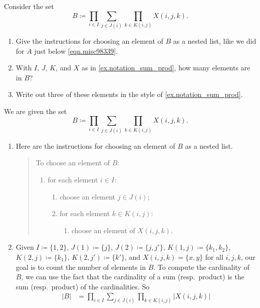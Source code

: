 \documentclass[Book-Poly]{subfiles}
\begin{document}
\begin{exercise}
Consider the set
\[B \coloneqq \prod_{i\in I}\sum_{j\in J(i)}\prod_{k\in K(i,j)}X(i,j,k).\]
\begin{enumerate}
	\item Give the instructions for choosing an element of $B$ as a nested list, like we did for $A$ just below \eqref{eqn.misc98339}.
	\item With $I$, $J$, $K$, and $X$ as in \cref{ex.notation_sum_prod}, how many elements are in $B$?
	\item Write out three of these elements in the style of \cref{ex.notation_sum_prod}.
\qedhere
\end{enumerate}
\begin{solution}
We are given the set
\[
    B \coloneqq \prod_{i\in I}\sum_{j\in J(i)}\prod_{k\in K(i,j)}X(i,j,k).
\]
\begin{enumerate}
	\item Here are the instructions for choosing an element of $B$ as a nested list.
	\begin{quote}
	    To choose an element of $B$:
	    \begin{enumerate}[label=\arabic*.]
	        \item for each element $i \in I$:
	        \begin{enumerate}[label=\arabic*.]
	            \item choose an element $j \in J(i)$;
	            \item for each element $k \in K(i, j)$:
	            \begin{enumerate}[label=\arabic*.]
	                \item choose an element of $X(i,j,k)$.
	            \end{enumerate}
	        \end{enumerate}
	    \end{enumerate}
	\end{quote}
	\item Given $I\coloneqq\{1,2\}$, $J(1)\coloneqq\{j\}$, $J(2)\coloneqq\{j,j'\}$, $K(1,j)\coloneqq\{k_1,k_2\}$, $K(2,j)\coloneqq\{k_1\}$, $K(2,j')\coloneqq\{k'\}$, and $X(i,j,k)=\{x,y\}$ for all $i,j,k$, our goal is to count the number of elements in $B$.
	To compute the cardinality of $B$, we can use the fact that the cardinality of a sum (resp.\ product) is the sum (resp.\ product) of the cardinalities.
	So
	\begin{align*}
	    |B| &= \prod_{i\in I}\sum_{j\in J(i)}\prod_{k\in K(i,j)}|X(i,j,k)| \\

\end{align*}
\end{enumerate}
\end{solution}
\end{exercise}
\end{document}
